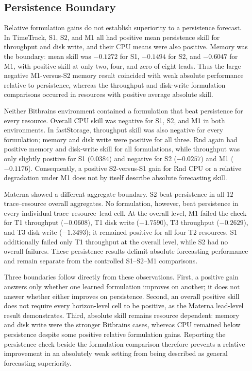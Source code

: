 \documentclass[a4paper,fleqn]{cas-dc}
\begin{document}
\subsection{Persistence Boundary}
\label{sec:results-persistence}

Relative formulation gains do not establish superiority to a persistence
forecast. In TimeTrack, S1, S2, and M1 all had positive mean persistence skill
for throughput and disk write, and their CPU means were also positive. Memory
was the boundary: mean skill was $-0.1272$ for S1, $-0.1494$ for S2, and
$-0.6047$ for M1, with positive skill at only two, four, and zero of eight
leads. Thus the large negative M1-versus-S2 memory result coincided with weak
absolute performance relative to persistence, whereas the throughput and
disk-write formulation comparisons occurred in resources with positive
average absolute skill.

Neither Bitbrains environment contained a formulation that beat persistence
for every resource. Overall CPU skill was negative for S1, S2, and M1 in both
environments. In fastStorage, throughput skill was also negative for every
formulation; memory and disk write were positive for all three. Rnd again had
positive memory and disk-write skill for all formulations, while throughput
was only slightly positive for S1 ($0.0384$) and negative for S2 ($-0.0257$)
and M1 ($-0.1176$). Consequently, a positive S2-versus-S1 gain for Rnd CPU or a
relative degradation under M1 does not by itself describe absolute forecasting
skill.

Materna showed a different aggregate boundary. S2 beat persistence in all 12
trace--resource overall aggregates. No formulation, however, beat persistence
in every individual trace--resource--lead cell. At the overall level, M1 failed
the check for T1 throughput ($-0.0608$), T1 disk write ($-1.7590$), T3
throughput ($-0.2629$), and T3 disk write ($-1.3493$); it remained positive for
all four T2 resources. S1 additionally failed only T1 throughput at the overall
level, while S2 had no overall failures. These persistence results delimit
absolute forecasting performance and remain separate from the controlled
S1--S2--M1 comparisons.

Three boundaries follow directly from these observations. First, a positive
gain answers only whether one learned formulation improves on another; it does
not answer whether either improves on persistence. Second, an overall positive
skill does not require every horizon-level cell to be positive, as the Materna
lead-level result demonstrates. Third, absolute skill remains resource
dependent: memory and disk write were the stronger Bitbrains cases, whereas
CPU remained below persistence despite some positive relative formulation
gains. Reporting the persistence check beside the formulation comparison
therefore prevents a relative improvement in an absolutely weak setting from
being described as general forecasting superiority.
\end{document}
